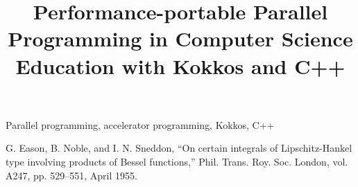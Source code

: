 \documentclass[conference]{IEEEtran}
\begin{document}
\title{Performance-portable Parallel Programming in Computer Science Education with Kokkos and C++}

\author{
\and
{}
\and
{}
}

\maketitle



\begin{IEEEkeywords}
Parallel programming, accelerator programming, Kokkos, C++
\end{IEEEkeywords}


\begin{thebibliography}{00}
 G. Eason, B. Noble, and I. N. Sneddon, ``On certain integrals of Lipschitz-Hankel type involving products of Bessel functions,'' Phil. Trans. Roy. Soc. London, vol. A247, pp. 529--551, April 1955.
\end{thebibliography}
\end{document}
